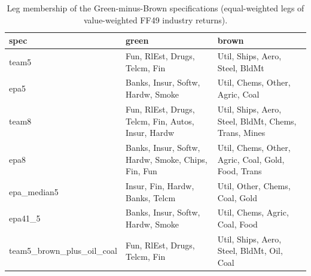 \begin{table}
\caption{Leg membership of the Green-minus-Brown specifications (equal-weighted legs of value-weighted FF49 industry returns).}
\label{tab:m4_legs}
\begin{tabular}{lll}
\toprule
spec & green & brown \\
\midrule
team5 & Fun, RlEst, Drugs, Telcm, Fin & Util, Ships, Aero, Steel, BldMt \\
epa5 & Banks, Insur, Softw, Hardw, Smoke & Util, Chems, Other, Agric, Coal \\
team8 & Fun, RlEst, Drugs, Telcm, Fin, Autos, Insur, Hardw & Util, Ships, Aero, Steel, BldMt, Chems, Trans, Mines \\
epa8 & Banks, Insur, Softw, Hardw, Smoke, Chips, Fin, Fun & Util, Chems, Other, Agric, Coal, Gold, Food, Trans \\
epa\_median5 & Insur, Fin, Hardw, Banks, Telcm & Util, Other, Chems, Coal, Gold \\
epa41\_5 & Banks, Insur, Softw, Hardw, Smoke & Util, Chems, Agric, Coal, Food \\
team5\_brown\_plus\_oil\_coal & Fun, RlEst, Drugs, Telcm, Fin & Util, Ships, Aero, Steel, BldMt, Oil, Coal \\
\bottomrule
\end{tabular}
\end{table}
